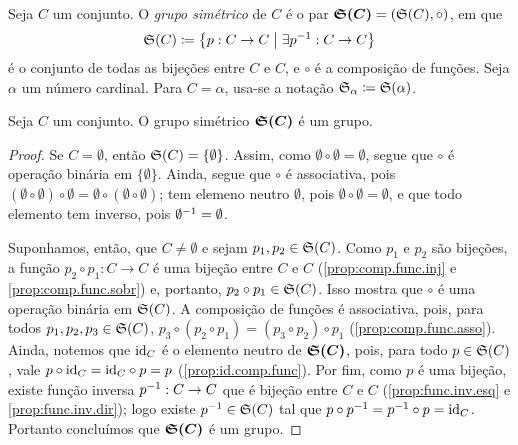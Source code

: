 \begin{defi}
Seja $C$ um conjunto. O \emph{grupo simétrico} de $C$ é o par $\bm{\mathfrak{S}(C)} = (\mathfrak{S}(C),\circ)$, em que	
	\begin{equation*}
	\simm{C} \coloneqq \set{p: C \to C}{\exists p\inv: C \to C}
	\end{equation*}
é o conjunto de todas as bijeções entre $C$ e $C$, e $\circ$ é a composição de funções. Seja $\alpha$ um número cardinal. Para $C = \alpha$, usa-se a notação $\sime_{\alpha} \coloneqq \simm{\alpha}$.
\end{defi}

\begin{prop}
	Seja $C$ um conjunto. O grupo simétrico $\bm{\mathfrak{S}(C)}$ é um grupo.
\end{prop}
\begin{proof}
	Se $C=\emptyset$, então $\mathfrak{S}(C)=\{\emptyset\}$. Assim, como $\emptyset \circ \emptyset = \emptyset$, segue que $\circ$ é operação binária em $\{\emptyset\}$. Ainda, segue que $\circ$ é associativa, pois $(\emptyset \circ \emptyset) \circ \emptyset = \emptyset \circ (\emptyset \circ \emptyset)$; tem elemeno neutro $\emptyset$, pois $\emptyset \circ \emptyset = \emptyset$, e que todo elemento tem inverso, pois $\emptyset^{-1} = \emptyset$.

	Suponhamos, então, que $C \neq \emptyset$ e sejam $p_1,p_2 \in \mathfrak{S}(C)$. Como $p_1$ e $p_2$ são bijeções, a função $p_2 \circ p_1: C \to C$ é uma bijeção entre $C$ e $C$ (\ref{prop:comp.func.inj} e \ref{prop:comp.func.sobr}) e, portanto, $p_2 \circ p_1 \in \mathfrak{S}(C)$. Isso mostra que $\circ$ é uma operação binária em $\mathfrak{S}(C)$. A composição de funções é associativa, pois, para todos $p_1,p_2,p_3 \in \mathfrak{S}(C)$, $p_3 \circ (p_2 \circ p_1) = (p_3 \circ p_2) \circ p_1$ (\ref{prop:comp.func.asso}). Ainda, notemos que $\mathrm{id}_C$ é o elemento neutro de $\bm{\mathfrak{S}(C)}$, pois, para todo $p \in \mathfrak{S}(C)$, vale $p \circ \mathrm{id}_C = \mathrm{id}_C \circ p = p$ (\ref{prop:id.comp.func}). Por fim, como $p$ é uma bijeção, existe função inversa $p^{-1}: C \to C$ que é bijeção entre $C$ e $C$ (\ref{prop:func.inv.esq} e \ref{prop:func.inv.dir}); logo existe $p^{-1} \in \mathfrak{S}(C)$ tal que $p \circ p^{-1} = p^{-1} \circ p = \mathrm{id}_C$. Portanto concluímos que $\bm{\mathfrak{S}(C)}$ é um grupo.
\end{proof}

